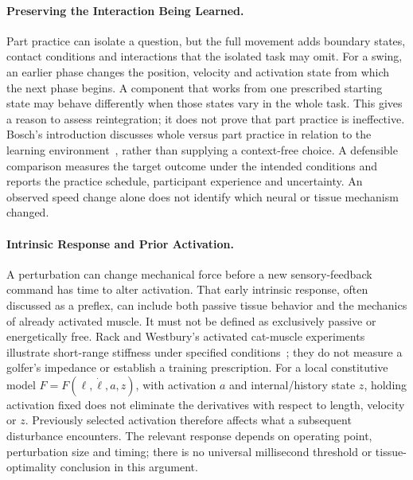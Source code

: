 
\paragraph{Preserving the Interaction Being Learned.}
Part practice can isolate a question, but the full movement adds boundary states, contact conditions and interactions that the isolated task may omit.
For a swing, an earlier phase changes the position, velocity and activation state from which the next phase begins.
A component that works from one prescribed starting state may behave differently when those states vary in the whole task.
This gives a reason to assess reintegration; it does not prove that part practice is ineffective.
Bosch's introduction discusses whole versus part practice in relation to the learning environment~\cite{Bosch2020}, rather than supplying a context-free choice.
A defensible comparison measures the target outcome under the intended conditions and reports the practice schedule, participant experience and uncertainty.
An observed speed change alone does not identify which neural or tissue mechanism changed.


\paragraph{Intrinsic Response and Prior Activation.}
A perturbation can change mechanical force before a new sensory-feedback command has time to alter activation.
That early intrinsic response, often discussed as a preflex, can include both passive tissue behavior and the mechanics of already activated muscle.
It must not be defined as exclusively passive or energetically free.
Rack and Westbury's activated cat-muscle experiments illustrate short-range stiffness under specified conditions~\cite{RackWestbury1974}; they do not measure a golfer's impedance or establish a training prescription.
For a local constitutive model $F=F(\ell,\dot\ell,a,z)$, with activation $a$ and internal/history state $z$, holding activation fixed does not eliminate the derivatives with respect to length, velocity or $z$.
Previously selected activation therefore affects what a subsequent disturbance encounters.
The relevant response depends on operating point, perturbation size and timing; there is no universal millisecond threshold or tissue-optimality conclusion in this argument.

